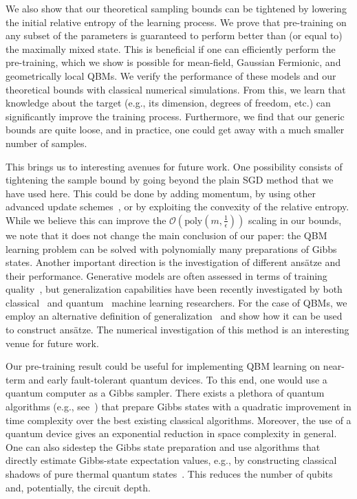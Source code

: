 \documentclass[
    reprint,
    aps,
    prx,
    longbibliography
]{revtex4-2}
\begin{document}
We also show that our theoretical sampling bounds can be tightened by lowering the initial relative entropy of the learning process. We prove that pre-training on any subset of the parameters is guaranteed to perform better than (or equal to) the maximally mixed state. This is beneficial if one can efficiently perform the pre-training, which we show is possible for mean-field, Gaussian Fermionic, and geometrically local QBMs. We verify the performance of these models and our theoretical bounds with classical numerical simulations. From this, we learn that knowledge about the target (e.g., its dimension, degrees of freedom, etc.) can significantly improve the training process. Furthermore, we find that our generic bounds are quite loose, and in practice, one could get away with a much smaller number of samples.  

This brings us to interesting avenues for future work. One possibility consists of tightening the sample bound by going beyond the plain SGD method that we have used here. This could be done by adding momentum, by using other advanced update schemes~\cite{foster2019complexity, Garrigos2023}, or by exploiting the convexity of the relative entropy. While we believe this can improve the $\mathcal{O}(\mathrm{poly}(m, \frac{1}{\epsilon}))$ scaling in our bounds, we note that it does not change the main conclusion of our paper: the QBM learning problem can be solved with polynomially many preparations of Gibbs states.
Another important direction is the investigation of different ans\"{a}tze and their performance. Generative models are often assessed in terms of training quality~\cite{riofrio2023performance}, but generalization capabilities have been recently investigated by both classical~\cite{zhao2018bias,thanhtung2021generalization} and quantum~\cite{du2022power,gili2023generalization} machine learning researchers. For the case of QBMs, we employ an alternative definition of generalization~\cite{Aaronson_2007} and show how it can be used to construct ans\"{a}tze. The numerical investigation of this method is an interesting venue for future work.

Our pre-training result could be useful for implementing QBM learning on near-term and early fault-tolerant quantum devices. To this end, one would use a quantum computer as a Gibbs sampler. There exists a plethora of quantum algorithms (e.g., see~\cite{Temme_2011, Chowdhury_2016, Holmes_2022, chifang2023quantum, zhang2023dissipative}) that prepare Gibbs states with a quadratic improvement in time complexity over the best existing classical algorithms. Moreover, the use of a quantum device gives an exponential reduction in space complexity in general. One can also sidestep the Gibbs state preparation and use algorithms that directly estimate Gibbs-state expectation values, e.g., by constructing classical shadows of pure thermal quantum states~\cite{Coopmans_2023}. This reduces the number of qubits and, potentially, the circuit depth.
\end{document}
